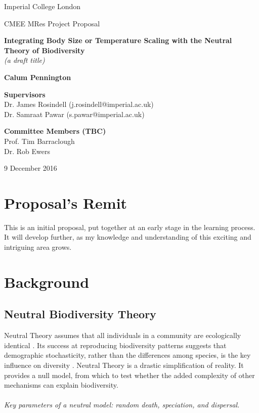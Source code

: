 \documentclass[11pt]{article}
\begin{document}
\begin{titlepage}
	\begin{center} %
		\vspace*{1cm} %
		
		\large
		Imperial College London
		
		\vspace{0.5cm}
		\large
		CMEE MRes Project Proposal
		
		\vspace{1.5cm}
		\LARGE
		\textbf{Integrating Body Size or Temperature Scaling with the Neutral Theory of Biodiversity}\\ %
		\emph{(a draft title)}
		
		\vspace{1.5cm}
		
		\large
		\textbf{Calum Pennington}
		
		\vspace{1.5cm}
		\textbf{Supervisors}\\
		Dr. James Rosindell (j.rosindell@imperial.ac.uk)\\
		Dr. Samraat Pawar (s.pawar@imperial.ac.uk)
		
		\vspace{1.5cm}
		\textbf{Committee Members (TBC)}\\
		Prof. Tim Barraclough\\
		Dr. Rob Ewers
		
		\vfill
		
		9 December 2016
		
	\end{center}
		
\end{titlepage}

\linenumbers

\section*{Proposal's Remit}
This is an initial proposal, put together at an early stage in the learning process. It will develop further, as my knowledge and understanding of this exciting and intriguing area grows.

\section*{Background}
\subsection*{Neutral Biodiversity Theory}
Neutral Theory assumes that all individuals in a community are ecologically identical \cite{rosindell2011unified}. Its success at reproducing biodiversity patterns suggests that demographic stochasticity, rather than the differences among species, is the key influence on diversity \cite{o2009integrative}. Neutral Theory is a drastic simplification of reality. It provides a null model, from which to test whether the added complexity of other mechanisms can explain biodiversity.\\
\\
\emph{Key parameters of a neutral model: random death, speciation, and dispersal.}
\end{document}
